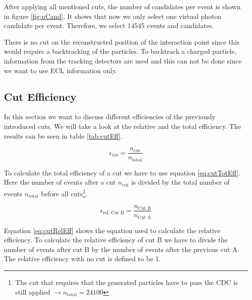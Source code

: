 \documentclass[a4paper,11pt,twosided,final,german,openbib,pdftex,listof=totoc,bibliography=totoc]{scrbook}
\begin{document}
After applying all mentioned cuts, the number of candidates per event is shown in figure \ref{fig:nCand}. It shows that now we only select one virtual photon candidate per event. Therefore, we select 14545 events and candidates.
\newline

There is no cut on the reconstructed position of the interaction point since this would require a backtracking of the particles. To backtrack a charged particle, information from the tracking detectors are used and this can not be done since we want to use ECL information only.




\subsection{Cut Efficiency}

In this section we want to discuss different efficiencies of the previously introduced cuts. We will take a look at the relative and the total efficiency. The results can be seen in table \ref{tab:cutEff}.

\begin{equation}
	\epsilon_{\textrm{tot}} = \frac{n_{\textrm{cut}}}{n_{\textrm{total}}}
	\label{eq:cutTotEff}
\end{equation}

To calculate the total efficiency of a cut we have to use equation \ref{eq:cutTotEff}. Here the number of events after a cut $n_{\textrm{cut}}$ is divided by the total number of events $n_{\textrm{total}}$ before all cuts\footnote{The cut that requires that the generated particles have to pass the CDC is still applied $\rightarrow n_{\textrm{total}} = 24100$}.

\begin{equation}
	\epsilon_{\textrm{rel; Cut B}} = \frac{n_{\textrm{Cut B}}}{n_{\textrm{Cut A}}}
	\label{eq:cutRelEff}
\end{equation}

Equation \ref{eq:cutRelEff} shows the equation used to calculate the relative efficiency. To calculate the relative efficiency of cut B we have to divide the number of events after cut B by the number of events after the previous
cut A. The relative efficiency with no cut is defined to be 1.
\end{document}
